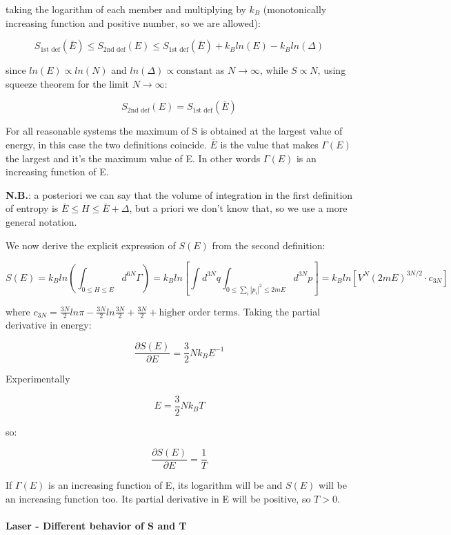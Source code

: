 \documentclass[a4paper, italian, openany]{book}
\begin{document}
taking the logarithm of each member and multiplying by $k_B$ (monotonically increasing function and positive number, so we are allowed):

$$S_{\mbox{1st def}}(\bar{E}) \le S_{\mbox{2nd def}}(E) \le S_{\mbox{1st def}}(\bar{E}) + k_B ln (E) - k_B ln(\Delta)$$

since $ln(E) \propto ln(N)$ and $ ln(\Delta) \propto \mbox{constant}$ as $N \to \infty$, while $S \propto N$, using squeeze theorem for the limit $N \to \infty$:

$$S_{\mbox{2nd def}}(E) = S_{\mbox{1st def}}(\bar{E})$$

For all reasonable systems the maximum of S is obtained at the largest value of energy, in this case the two definitions coincide. $\bar{E}$ is the value that makes $\Gamma(E)$ the largest and it's the maximum value of E. In other words $\Gamma(E)$ is an increasing function of E.

\textbf{N.B.}: a posteriori we can say that the volume of integration in the first definition of entropy is $\bar{E} \le H \le \bar{E} + \Delta$, but a priori we don't know that, so we use a more general notation.

We now derive the explicit expression of $S(E)$ from the second definition:

$$S(E) = k_B ln(\int_{0 \le H \le E}d^{6N}\Gamma) = k_B ln \left [ \int d^{3N}q \int_{0 \le \sum_i |p_i|^2 \le 2mE} d^{3N}p \right ] = k_B ln \left [ V^N (2mE)^{3N/2} \cdot c_{3N} \right ]$$

where $c_{3N} = \frac{3N}{2} ln\pi - \frac{3N}{2} ln \frac{3N}{2} + \frac{3N}{2} + \mbox{higher order terms}$.\newline 
Taking the partial derivative in energy:

$$\frac{\partial S(E)}{\partial E} = \frac{3}{2} N k_B E^{-1}$$

Experimentally 

$$E = \frac{3}{2} N k_B T$$

so:

$$\frac{\partial S(E)}{\partial E} = \frac{1}{T}$$

If $\Gamma(E)$ is an increasing function of E, its logarithm will be and $S(E)$ will be an increasing function too.\newline 
Its partial derivative in E will be positive, so $T > 0$.

\paragraph{Laser - Different behavior of S and T}
\end{document}
